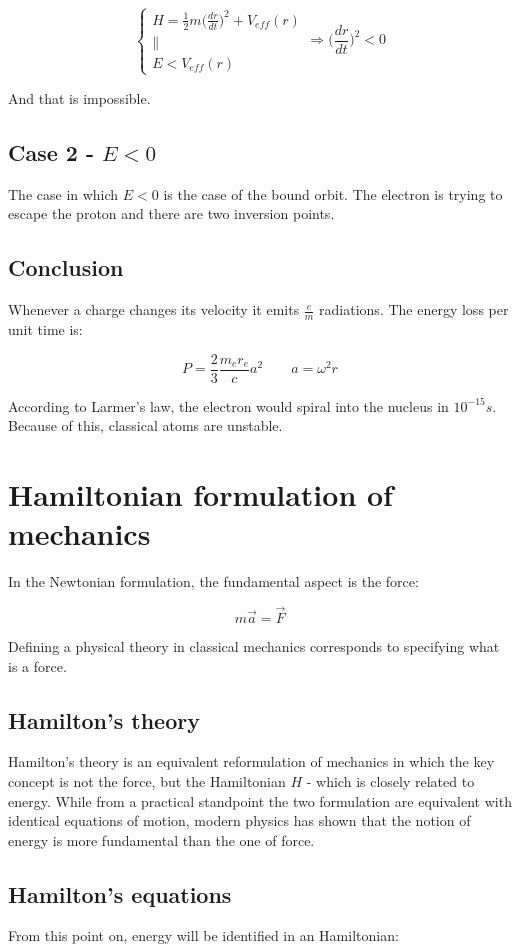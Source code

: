   $$\begin{cases} H = \frac{1}{2}m\biggl(\frac{d{r}}{d{t}}\biggr)^2+V_{eff}(r)\\
    \parallel\\
    E<V_{eff}(r)
  \end{cases}
  \Rightarrow \biggl(\frac{d{r}}{d{t}}\biggr)^2< 0$$

  And that is impossible.

  \subsection{Case 2 - $E<0$}
  The case in which $E<0$ is the case of the bound orbit.
  The electron is trying to escape the proton and there are two inversion points.
  
  \subsection{Conclusion}
  Whenever a charge changes its velocity it emits $\frac{e}{m}$ radiations.
  The energy loss per unit time is:

  $$P = \frac{2}{3}\frac{m_er_e}{c}a^2\qquad a = \omega^2 r$$

  According to Larmer's law, the electron would spiral into the nucleus in $10^{-15}s$.
  Because of this, classical atoms are unstable.

\section{Hamiltonian formulation of mechanics}
In the Newtonian formulation, the fundamental aspect is the force:

$$m \vec{a} = \vec{F}$$

Defining a physical theory in classical mechanics corresponds to specifying what is a force.

  \subsection{Hamilton's theory}
  Hamilton's theory is an equivalent reformulation of mechanics in which the key concept is not the force, but the Hamiltonian $H$ - which is closely related to energy.
  While from a practical standpoint the two formulation are equivalent with identical equations of motion, modern physics has shown that the notion of energy is more fundamental than the one of force.

  \subsection{Hamilton's equations}
  From this point on, energy will be identified in an Hamiltonian:

